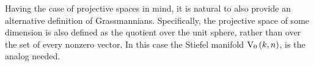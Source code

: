 





Having the case of projective spaces in mind, it is natural to also provide an alternative definition of Grassmannians.
Specifically, the projective space of some dimension is also defined as the quotient over the unit sphere, rather than over the set of every nonzero vector.
In this case the Stiefel manifold $\StO{k}{n}$, is the analog needed.

